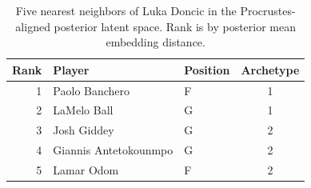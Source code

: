 \begin{table}[htbp]
  \centering\small
  \begin{tabular}{rllc}
    \toprule
    Rank & Player & Position & Archetype \\
    \midrule
    1 & Paolo Banchero & F & 1 \\
    2 & LaMelo Ball & G & 1 \\
    3 & Josh Giddey & G & 2 \\
    4 & Giannis Antetokounmpo & G & 2 \\
    5 & Lamar Odom & F & 2 \\
    \bottomrule
  \end{tabular}
  \caption{Five nearest neighbors of Luka Doncic in the Procrustes-aligned posterior latent space. Rank is by posterior mean embedding distance.}
  \label{tab:Luka_Doncic_neighbors}
\end{table}

